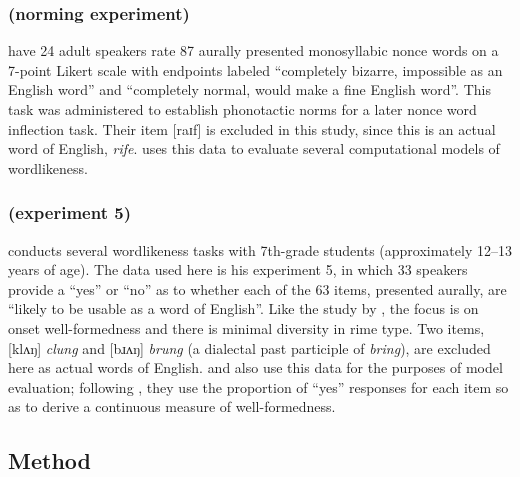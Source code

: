 \subsubsection{\citealt{Albright2003b} (norming experiment)}

\citet{Albright2003b} have 24 adult speakers rate 87 aurally presented monosyllabic nonce words on a 7-point Likert scale with endpoints labeled ``completely bizarre, impossible as an English word'' and ``completely normal, would make a fine English word''. This task was administered to establish phonotactic norms for a later nonce word inflection task. Their item [raɪf] is excluded in this study, since this is an actual word of English, \emph{rife}. \citet{Albright2009a} uses this data to evaluate several computational models of wordlikeness.

\subsubsection{\citealt{Scholes1966} (experiment 5)}

\citet{Scholes1966} conducts several wordlikeness tasks with 7th-grade students (approximately 12--13 years of age). The data used here is his experiment 5, in which 33 speakers provide a ``yes'' or ``no'' as to whether each of the 63 items, presented aurally, are ``likely to be usable as a word of English''. Like the study by \citet{Albright2007}, the focus is on onset well-formedness and there is minimal diversity in rime type. Two items, [klʌŋ] \emph{clung} and [bɹʌŋ] \emph{brung} (a dialectal past participle of \emph{bring}), are excluded here as actual words of English. \citet{Albright2009a} and \citet{Hayes2008a} also use this data for the purposes of model evaluation; following \citet{Frisch2000}, they use the proportion of ``yes'' responses for each item so as to derive a continuous measure of well-formedness.

\subsection{Method}


